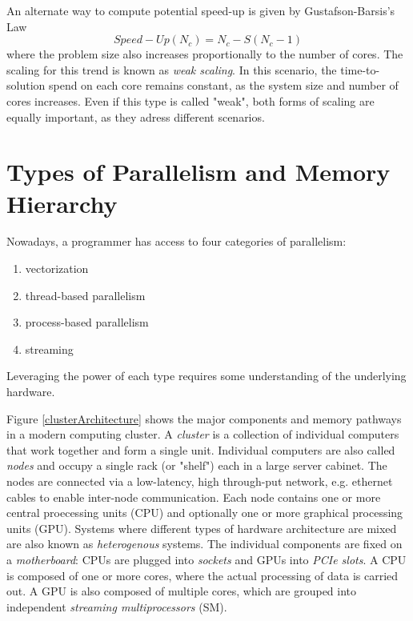 An alternate way to compute potential speed-up is given by Gustafson-Barsis's Law
\begin{equation}
Speed-Up(N_c) = N_c - S(N_c-1)
\end{equation}
\noindent where the problem size also increases proportionally to the number of cores. The scaling for this trend is known as \emph{weak scaling}. In this scenario, the time-to-solution spend on each core remains constant, as the system size and number of cores increases. Even if this type is called "weak", both forms of scaling are equally important, as they adress different scenarios. 

\section{Types of Parallelism and Memory Hierarchy}

Nowadays, a programmer has access to four categories of parallelism:
\begin{enumerate}
\item vectorization
\item thread-based parallelism
\item process-based parallelism
\item streaming
\end{enumerate} 
\noindent Leveraging the power of each type requires some understanding of the underlying hardware. 

Figure \ref{clusterArchitecture} shows the major components and memory pathways in a modern computing cluster. A \emph{cluster} is a collection of individual computers that work together and form a single unit. Individual computers are also called \emph{nodes} and occupy a single rack (or "shelf") each in a large server cabinet. The nodes are connected via a low-latency, high through-put network, e.g. ethernet cables to enable inter-node communication. Each node contains one or more central proecessing units (CPU) and optionally one or more graphical processing units (GPU). Systems where different types of hardware architecture are mixed are also known as \emph{heterogenous} systems. The individual components are fixed on a \emph{motherboard}: CPUs are plugged into \emph{sockets} and GPUs into \emph{PCIe slots}. A CPU is composed of one or more cores, where the actual processing of data is carried out. A GPU is also composed of multiple cores, which are grouped into independent \emph{streaming multiprocessors} (SM). 

